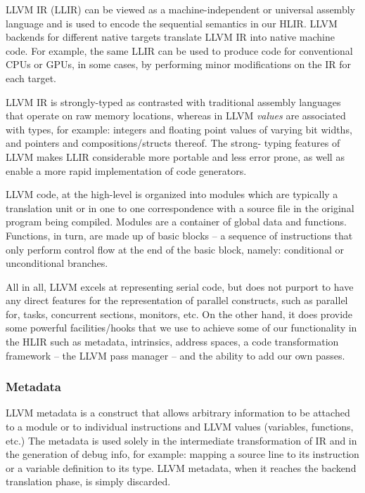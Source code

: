 \documentclass[12pt]{article}
\begin{document}
LLVM IR (LLIR) can be viewed as a machine-independent or universal assembly language and is used to encode the sequential semantics in our HLIR. LLVM backends for different native targets translate LLVM IR into native machine code. For example, the same LLIR can be used to produce code for conventional CPUs or GPUs, in some cases, by performing minor modifications on the IR for each target.

LLVM IR is strongly-typed as contrasted with traditional assembly languages that operate on raw memory locations, whereas in LLVM {\it values} are associated with types, for example: integers and floating point values of varying bit widths, and pointers and compositions/structs thereof. The strong- typing features of LLVM makes LLIR considerable more portable and less error prone, as well as enable a more rapid implementation of code generators.

LLVM code, at the high-level is organized into modules which are typically a translation unit or in one to one correspondence with a source file in the original program being compiled. Modules are a container of global data and functions. Functions, in turn, are made up of basic blocks -- a sequence of instructions that only perform control flow at the end of the basic block, namely: conditional or unconditional branches.

All in all, LLVM excels at representing serial code, but does not purport to have any direct features for the representation of parallel constructs, such as parallel for, tasks, concurrent sections, monitors, etc. On the other hand, it does provide some powerful facilities/hooks that we use to achieve some of our functionality in the HLIR such as metadata, intrinsics, address spaces, a code transformation framework -- the LLVM pass manager -- and the ability to add our own passes.

\subsubsection{Metadata}

LLVM metadata is a construct that allows arbitrary information to be attached to a module or to individual instructions and LLVM values (variables, functions, etc.) The metadata is used solely in the intermediate transformation of IR and in the generation of debug info, for example: mapping a source line to its instruction or a variable definition to its type. LLVM metadata, when it reaches the backend translation phase, is simply discarded.
\end{document}
